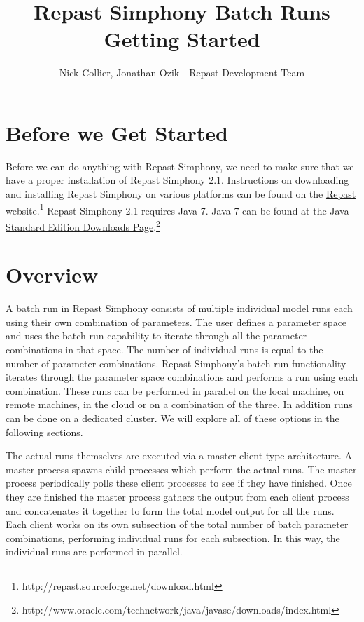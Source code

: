 \documentclass[11pt]{amsart}
\title{Repast Simphony Batch Runs Getting Started}
\author{Nick Collier, Jonathan Ozik  - Repast Development Team}
\begin{document}
 
\maketitle
\setcounter{section}{-1}

\section{Before we Get Started}
Before we can do anything with Repast Simphony, we need to make sure that we have a proper installation of Repast Simphony 2.1. Instructions on downloading and installing Repast Simphony on various platforms can be found on the \href{http://repast.sourceforge.net/download.html}{Repast website}.\footnote{http://repast.sourceforge.net/download.html} Repast Simphony 2.1 requires Java 7. Java 7 can be found at the \href{http://www.oracle.com/technetwork/java/javase/downloads/index.html}{Java Standard Edition Downloads Page}.\footnote{http://www.oracle.com/technetwork/java/javase/downloads/index.html}

\section{Overview}
A batch run in Repast Simphony consists of multiple individual model runs each using their own combination of parameters. The user defines a parameter space and uses the batch run capability to iterate through all the parameter combinations in that space. The number of individual runs is equal to the number of parameter combinations. Repast Simphony's batch run functionality iterates through the parameter space combinations and performs a run using each combination.  These runs can be performed in parallel on the local machine, on remote machines, in the cloud or on a combination of the three. In addition runs can be done on a dedicated cluster. We will explore all of these options in the following sections.

The actual runs themselves are executed via a master client type architecture. A master process spawns child processes which perform the actual runs. The master process periodically polls these client processes to see if they have finished. Once they are finished the master process gathers the output from each client process and concatenates it together to form the total model output for all the runs.  Each client works on its own subsection of the total number of batch parameter combinations, performing individual runs for each subsection. In this way, the individual runs are performed in parallel.
\end{document}
